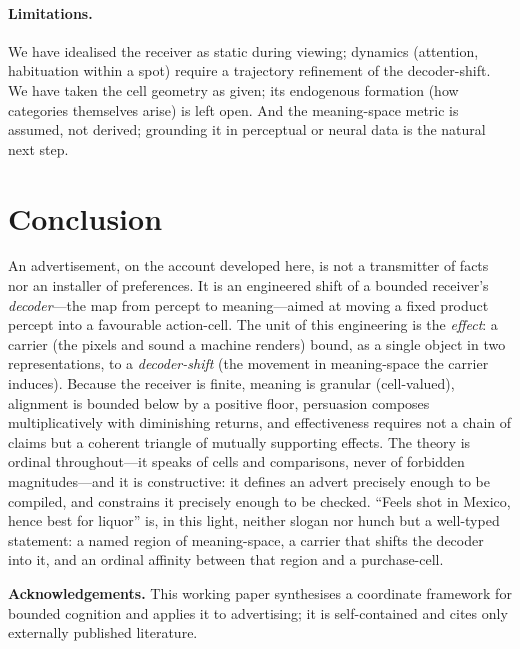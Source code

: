 \documentclass[twocolumn,11pt,a4paper]{article}
\theoremstyle{adv}
\theoremstyle{definition}
\theoremstyle{remark}
\begin{document}
\paragraph{Limitations.}
We have idealised the receiver as static during viewing; dynamics
(attention, habituation within a spot) require a trajectory refinement of
the decoder-shift. We have taken the cell geometry as given; its
endogenous formation (how categories themselves arise) is left open. And
the meaning-space metric is assumed, not derived; grounding it in
perceptual or neural data is the natural next step.

\section{Conclusion}
\label{sec:conclusion}

An advertisement, on the account developed here, is not a transmitter of
facts nor an installer of preferences. It is an engineered shift of a
bounded receiver's \emph{decoder}---the map from percept to meaning---aimed
at moving a fixed product percept into a favourable action-cell. The unit
of this engineering is the \emph{effect}: a carrier (the pixels and sound a
machine renders) bound, as a single object in two representations, to a
\emph{decoder-shift} (the movement in meaning-space the carrier induces).
Because the receiver is finite, meaning is granular (cell-valued),
alignment is bounded below by a positive floor, persuasion composes
multiplicatively with diminishing returns, and effectiveness requires not a
chain of claims but a coherent triangle of mutually supporting effects. The
theory is ordinal throughout---it speaks of cells and comparisons, never of
forbidden magnitudes---and it is constructive: it defines an advert
precisely enough to be compiled, and constrains it precisely enough to be
checked. ``Feels shot in Mexico, hence best for liquor'' is, in this light,
neither slogan nor hunch but a well-typed statement: a named region of
meaning-space, a carrier that shifts the decoder into it, and an ordinal
affinity between that region and a purchase-cell.

\bigskip
\noindent\textbf{Acknowledgements.} This working paper synthesises a
coordinate framework for bounded cognition and applies it to advertising;
it is self-contained and cites only externally published literature.



\end{document}
